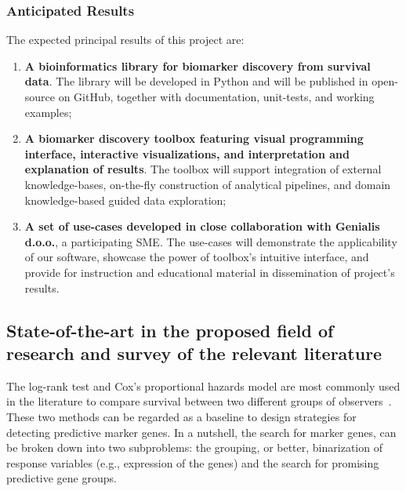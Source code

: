 \documentclass[11pt,a4paper]{article}
\renewcommand{\bold}{\textbf}
\begin{document}
\subsubsection*{Anticipated Results}
The expected principal results of this project are:
\begin{enumerate}
	\item \bold{A bioinformatics library for biomarker discovery from survival data}. The library will be developed in Python and will be published in open-source on GitHub, together with documentation, unit-tests, and working examples;
	\item \bold{A biomarker discovery toolbox featuring visual programming interface, interactive visualizations, and interpretation and explanation of results}. The toolbox will support integration of external knowledge-bases, on-the-fly construction of analytical pipelines, and domain knowledge-based guided data exploration;
	\item \bold{A set of use-cases developed in close collaboration with Genialis d.o.o.}, a participating SME. The use-cases will demonstrate the applicability of our software, showcase the power of toolbox's intuitive interface, and provide for instruction and educational material in dissemination of project's results.
\end{enumerate}



\subsection{State-of-the-art in the proposed field of research and survey of the relevant literature}

The log-rank test and Cox's proportional hazards model are most commonly used in the literature to compare survival between two different groups of observers~\cite{singh2011survival}. These two methods can be regarded as a baseline to design strategies for detecting predictive marker genes. In a nutshell, the search for marker genes, can be broken down into two subproblems: the grouping, or better, binarization of response variables (e.g., expression of the genes) and the search for promising predictive gene groups.
\end{document}
